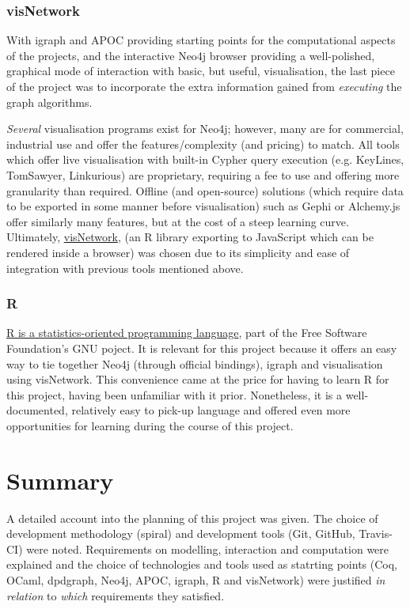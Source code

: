 \subsubsection{visNetwork}

With igraph and APOC providing starting points for the computational aspects of
the projects, and the interactive Neo4j browser providing a well-polished,
graphical mode of interaction with basic, but useful, visualisation, the last
piece of the project was to incorporate the extra information gained from
\emph{executing} the graph algorithms.

\emph{Several} visualisation programs exist for Neo4j; however, many are for
commercial, industrial use and offer the features/complexity (and pricing) to
match. All tools which offer live visualisation with built-in Cypher query
execution (e.g. KeyLines, TomSawyer, Linkurious) are proprietary, requiring a
fee to use and offering more granularity than required. Offline (and
open-source) solutions (which require data to be exported in some manner before
visualisation) such as Gephi or Alchemy.js offer similarly many features, but at
the cost of a steep learning curve.  Ultimately,
\href{http://datastorm-open.github.io/visNetwork}{visNetwork}, (an R library
exporting to JavaScript which can be rendered inside a browser) was chosen due
to its simplicity and ease of integration with previous tools mentioned above.

\subsubsection{R}

\href{http://www.r-project.org}{R is a statistics-oriented programming language},
part of the Free Software Foundation's GNU poject. It is relevant for this
project because it offers an easy way to tie together Neo4j (through official
bindings), igraph and visualisation using visNetwork. This convenience came at
the price for having to learn R for this project, having been unfamiliar with it
prior. Nonetheless, it is a well-documented, relatively easy to pick-up language
and offered even more opportunities for learning during the course of this
project.

\section{Summary}

A detailed account into the planning of this project was given. The choice of
development methodology (spiral) and development tools (Git, GitHub, Travis-CI)
were noted. Requirements on modelling, interaction and computation were
explained and the choice of technologies and tools used as statrting points
(Coq, OCaml, dpdgraph, Neo4j, APOC, igraph, R and visNetwork) were justified
\emph{in relation} to \emph{which} requirements they satisfied.
